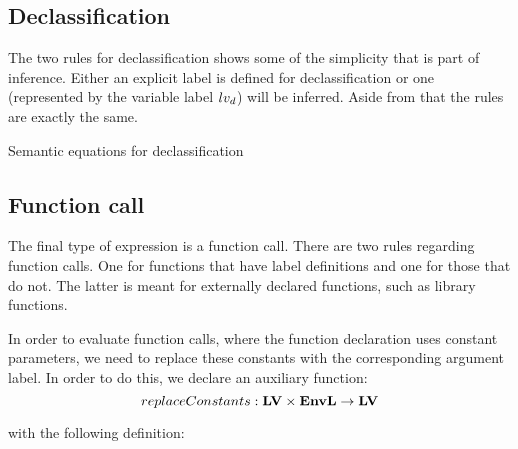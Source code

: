 \subsection{Declassification}
The two rules for declassification shows some of the simplicity that is part of inference.
Either an explicit label is defined for declassification or one (represented by the variable label $lv_d$) will be inferred.
Aside from that the rules are exactly the same.

\begin{table}[H]
\begin{semanticequations}
 \seSpace
\end{semanticequations}
\caption{Semantic equations for declassification}
\label{cstr:declassification}
\end{table}

\subsection{Function call}
The final type of expression is a function call.
There are two rules regarding function calls.
One for functions that have label definitions and one for those that do not.
The latter is meant for externally declared functions, such as library functions.

In order to evaluate function calls, where the function declaration uses constant parameters, we need to replace these constants with the corresponding argument label.
In order to do this, we declare an auxiliary function:
\[ replaceConstants : \mathbf{LV} \times \mathbf{EnvL} \rightarrow \mathbf{LV} \]

with the following definition:

